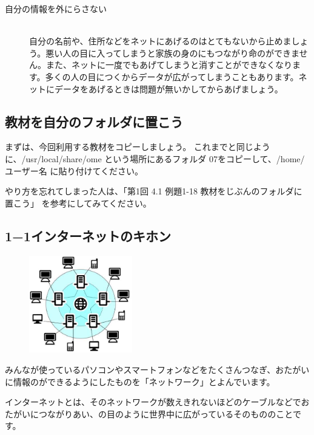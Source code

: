 \documentclass[a4paper,12pt,dvipdfmx]{jarticle}
\begin{document}
\begin{description}
	\item[自分の情報を外にらさない]~\\
	自分の名前や、住所などをネットにあげるのはとてもないから止めましょう。悪い人の目に入ってしまうと家族の身のにもつながり命のができません。また、ネットに一度でもあげてしまうと消すことができなくなります。多くの人の目につくからデータが広がってしまうこともあります。ネットにデータをあげるときは問題が無いかしてからあげましょう。

\end{description}

\clearpage\subsection*{教材を自分のフォルダに置こう}
まずは、今回利用する教材をコピーしましょう。
これまでと同じように、/usr/local/share/ome という場所にあるフォルダ 07をコピーして、/home/ユーザー名 に貼り付けてください。

やり方を忘れてしまった人は、「第1回 4.1 例題1-18 教材をじぶんのフォルダに置こう」 を参考にしてみてください。

\subsection*{1−1インターネットのキホン}
\begin{figure}
	\includegraphics[width=0.4\textwidth]{ome7-img002.eps}
\end{figure}

みんなが使っているパソコンやスマートフォンなどをたくさんつなぎ、おたがいに情報のができるようにしたものを「ネットワーク」とよんでいます。

インターネットとは、そのネットワークが数えきれないほどのケーブルなどでおたがいにつながりあい、の目のように世界中に広がっているそのもののことです。


\bigskip
\end{document}
